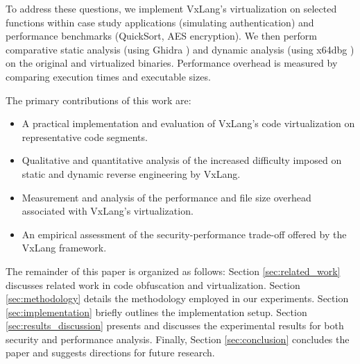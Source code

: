 To address these questions, we implement VxLang's virtualization on selected functions within case study applications (simulating authentication) and performance benchmarks (QuickSort, AES encryption). We then perform comparative static analysis (using Ghidra \cite{Nat19}) and dynamic analysis (using x64dbg \cite{Dun14}) on the original and virtualized binaries. Performance overhead is measured by comparing execution times and executable sizes.

The primary contributions of this work are:
\begin{itemize}
    \item A practical implementation and evaluation of VxLang's code virtualization on representative code segments.
    \item Qualitative and quantitative analysis of the increased difficulty imposed on static and dynamic reverse engineering by VxLang.
    \item Measurement and analysis of the performance and file size overhead associated with VxLang's virtualization.
    \item An empirical assessment of the security-performance trade-off offered by the VxLang framework.
\end{itemize}

The remainder of this paper is organized as follows: Section \ref{sec:related_work} discusses related work in code obfuscation and virtualization. Section \ref{sec:methodology} details the methodology employed in our experiments. Section \ref{sec:implementation} briefly outlines the implementation setup. Section \ref{sec:results_discussion} presents and discusses the experimental results for both security and performance analysis. Finally, Section \ref{sec:conclusion} concludes the paper and suggests directions for future research.

